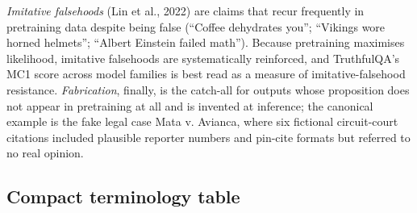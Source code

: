 \emph{Imitative falsehoods} (Lin et al., 2022) are claims that recur frequently in pretraining data despite being false (``Coffee dehydrates you''; ``Vikings wore horned helmets''; ``Albert Einstein failed math''). Because pretraining maximises likelihood, imitative falsehoods are systematically reinforced, and TruthfulQA's MC1 score across model families is best read as a measure of imitative-falsehood resistance. \emph{Fabrication}, finally, is the catch-all for outputs whose proposition does not appear in pretraining at all and is invented at inference; the canonical example is the fake legal case Mata v. Avianca, where six fictional circuit-court citations included plausible reporter numbers and pin-cite formats but referred to no real opinion.

\subsection{Compact terminology table}\label{compact-terminology-table}

